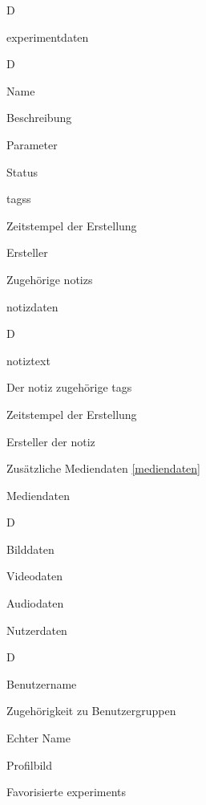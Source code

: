 \begin{anforderung}{D}
    \item \label{experiment_daten}\gls{experiment}daten
    \begin{subanforderung}{D}
        \item Name
        \item Beschreibung
        \item Parameter
        \item Status
        \item \glspl{tag}s
        \item Zeitstempel der Erstellung
        \item \label{experiment_ersteller} Ersteller
        \item Zugehörige \glspl{notiz}
    \end{subanforderung}

    \item \label{notiz_daten}\gls{notiz}daten
    \begin{subanforderung}{D}
        \item \gls{notiz}text
        \item Der \gls{notiz} zugehörige \glspl{tag}
        \item Zeitstempel der Erstellung
        \item \label{notiz_ersteller} Ersteller der \gls{notiz}
        \item Zusätzliche Mediendaten \ref{mediendaten}
    \end{subanforderung}

    \item \label{mediendaten} Mediendaten
    \begin{subanforderung}{D}
        \item Bilddaten
        \item Videodaten
        \item Audiodaten
    \end{subanforderung}

    \item Nutzerdaten
    \begin{subanforderung}{D}
        \item Benutzername
        \item Zugehörigkeit zu Benutzergruppen
        \item Echter Name
        \item Profilbild
        \item Favorisierte \glspl{experiment}
    \end{subanforderung}
\end{anforderung}
\newpage
